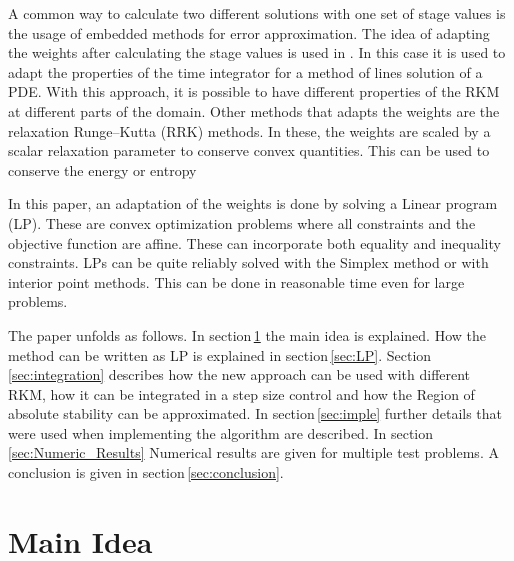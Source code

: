 \documentclass[a4paper]{scrartcl}
\numberwithin{equation}{section}
\theoremstyle{plain}
\theoremstyle{definition}
\numberwithin{theorem}{section}
\newcommand{\1}{\mathbbm{1}}
\begin{document}
A common way to calculate two different solutions with one set of stage values is the usage of embedded methods for error approximation. 
The idea of adapting the weights after calculating the stage values is used in \cite{ketcheson_spatially_2013}.
In this case it is used to adapt the properties of the time integrator for a method of lines solution of a PDE. With this approach, it is possible to have different properties of the RKM at different parts of the domain. 
Other methods that adapts the weights are the relaxation Runge–Kutta (RRK) methods. 
In these, the weights are scaled by a scalar relaxation parameter to conserve convex quantities. This can be used to conserve the energy or entropy \cite{ranocha_relaxation_2019,ketcheson_relaxation_2019}


In this paper, an adaptation of the weights is done by solving a Linear program (LP).
These are convex optimization problems where all constraints and the objective function are affine. These can incorporate both equality and inequality constraints. 
LPs can be quite reliably solved with the Simplex method or with interior point methods. This can be done in reasonable time even for large problems. 
\cite{boyd_convex_2004}

The paper unfolds as follows. In section\,\ref{sec:main_idea} the main idea is explained. How the method can be written as LP is explained in section\,\ref{sec:LP}.
Section\,\ref{sec:integration} describes how the new approach can be used with different RKM, how it can be integrated in a step size control and how the Region of absolute stability can be approximated.  
In section\,\ref{sec:imple} further details that were used when implementing the algorithm are described.
In section\,\ref{sec:Numeric_Results} Numerical results are given for multiple test problems.
A conclusion is given in section\,\ref{sec:conclusion}.




\section{Main Idea}\label{sec:main_idea}
\end{document}
